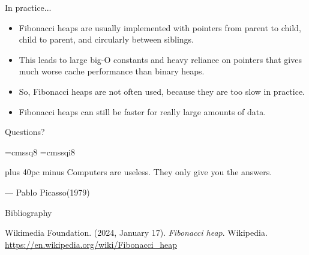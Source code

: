 \documentclass[aspectratio=169]{beamer}
\begin{document}
\begin{frame}{In practice...}
    \begin{itemize}
        \item Fibonacci heaps are usually implemented with pointers from parent to child, child to parent, and circularly between siblings.\pause
        \item This leads to large big-O constants and heavy reliance on pointers that gives much worse cache performance than binary heaps.\pause
        \item So, Fibonacci heaps are not often used, because they are too slow in practice.\pause
        \item Fibonacci heaps can still be faster for really large amounts of data.
    \end{itemize}
\end{frame}


\begin{frame}{}
      \begin{center}
    {\color{sigma@mainblue} \LARGE Questions?}
  \end{center}
\end{frame}


\font\eightss=cmssq8
\font\eightssi=cmssqi8
\newcommand\quoteAuthorDate[3]{\begingroup
  \baselineskip 10pt
  \parfillskip 0pt
  \interlinepenalty 10000 %
  \leftskip 0pt plus 40pc minus \parindent
  \let\rm=\eightss
  \let\sl=\eightssi
  \everypar{\sl}#1\par
  \nobreak\smallskip
  \noindent\rm--- #2\unskip\enspace(#3)\par
  \endgroup}
\begin{frame}
    \begin{center}
        \item \quoteAuthorDate{Computers are useless. They only give you the answers.}{Pablo Picasso}{\textcolor{sigma@mainblue}{1979}}
    \end{center}
\end{frame}

\begin{frame}[allowframebreaks]{Bibliography}
    
    
     Wikimedia Foundation. (2024, January 17). \textit{Fibonacci heap}. Wikipedia. \url{https://en.wikipedia.org/wiki/Fibonacci_heap}
\end{frame}
\end{document}

